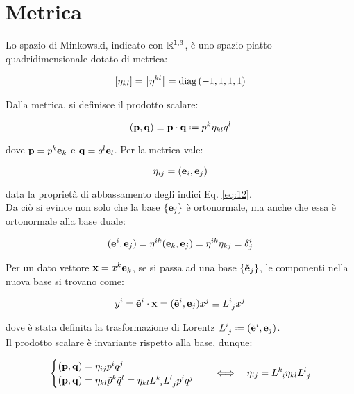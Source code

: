 
\section{Metrica}

Lo spazio di Minkowski, indicato con $ \mathbb{R}^{1,3} $, è uno spazio piatto quadridimensionale dotato di metrica:

\begin{equation}
	\left[\eta_{kl}\right] = \left[\eta^{kl}\right] = \text{diag}\,(-1,1,1,1)
	\label{eq:2.1}
\end{equation}

Dalla metrica, si definisce il prodotto scalare:

\begin{equation}
	(\ve{p},\ve{q}) \equiv \ve{p}\cdot\ve{q} \defeq p^k \eta_{kl} q^l
	\label{eq:2.2}
\end{equation}

dove $ \mathbf{p} = p^k \mathbf{e}_k $ e $ \mathbf{q} = q^l \mathbf{e}_l $. Per la metrica vale:

\begin{equation}
	\eta_{ij} = (\mathbf{e}_i,\mathbf{e}_j)
	\label{eq:2.3}
\end{equation}

data la proprietà di abbassamento degli indici Eq. \ref{eq:12}.\\
Da ciò si evince non solo che la base $ \{\mathbf{e}_j\} $ è ortonormale, ma anche che essa è ortonormale alla base duale:

\begin{equation}
	(\mathbf{e}^i,\mathbf{e}_j) = \eta^{ik} (\mathbf{e}_k,\mathbf{e}_j) = \eta^{ik} \eta_{kj} = \delta^i_j
	\label{eq:2.4}
\end{equation}

Per un dato vettore $ \mathbf{x} = x^k \mathbf{e}_k $, se si passa ad una base $ \{\tilde{\mathbf{e}}_j\} $, le componenti nella nuova base si trovano come:

\begin{equation}
	y^i = \tilde{\mathbf{e}}^i \cdot \mathbf{x} = (\tilde{\mathbf{e}}^i,\mathbf{e}_j) x^j \equiv L^i_{\,\,j} x^j
	\label{eq:2.5}
\end{equation}

dove è stata definita la trasformazione di Lorentz $ L^i_{\,\,j} \defeq (\tilde{\ve{e}}^i,\ve{e}_j) $.\\
Il prodotto scalare è invariante rispetto alla base, dunque:

\begin{equation}
	\begin{cases}
		(\mathbf{p},\mathbf{q}) = \eta_{ij} p^i q^j  \\
		(\mathbf{p},\mathbf{q}) = \eta_{kl} \tilde{p}^k \tilde{q}^l = \eta_{kl} L^k_{\,\,\,i} L^l_{\,\,j} p^i q^j
	\end{cases}
	\quad \Longleftrightarrow \quad \eta_{ij} = L^k_{\,\,\,i} \eta_{kl} L^l_{\,\,j}
	\label{eq:2.6}
\end{equation}

